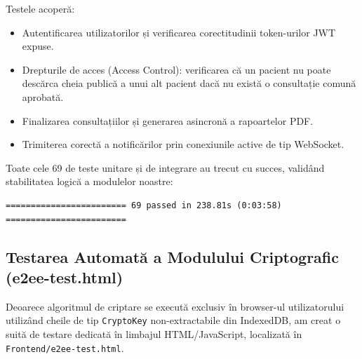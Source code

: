 Testele acoperă:
\begin{itemize}
    \item Autentificarea utilizatorilor și verificarea corectitudinii token-urilor JWT expuse.
    \item Drepturile de acces (Access Control): verificarea că un pacient nu poate descărca cheia publică a unui alt pacient dacă nu există o consultație comună aprobată.
    \item Finalizarea consultațiilor și generarea asincronă a rapoartelor PDF.
    \item Trimiterea corectă a notificărilor prin conexiunile active de tip WebSocket.
\end{itemize}

Toate cele 69 de teste unitare și de integrare au trecut cu succes, validând stabilitatea logică a modulelor noastre:

\begin{verbatim}
======================== 69 passed in 238.81s (0:03:58) ========================
\end{verbatim}

\subsection{Testarea Automată a Modulului Criptografic (e2ee-test.html)}
Deoarece algoritmul de criptare se execută exclusiv în browser-ul utilizatorului utilizând cheile de tip \texttt{CryptoKey} non-extractabile din IndexedDB, am creat o suită de testare dedicată în limbajul HTML/JavaScript, localizată în \texttt{Frontend/e2ee-test.html}. 

